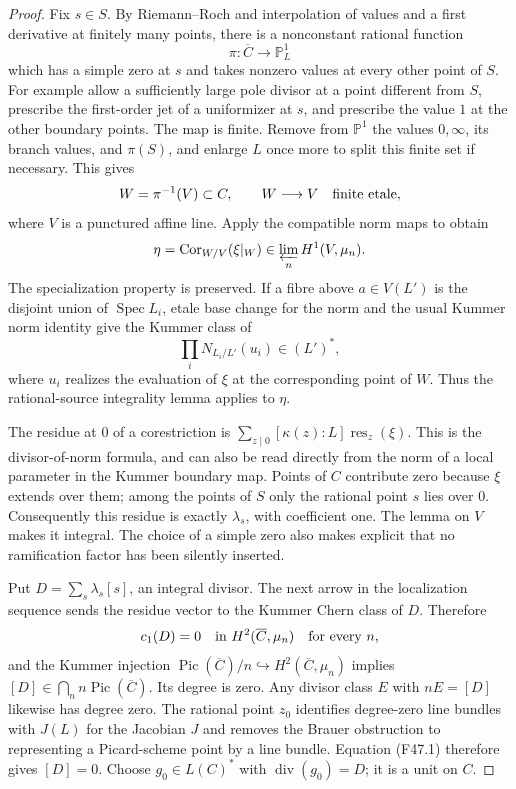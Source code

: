 \begin{proof}
Fix $s\in S$. By Riemann--Roch and interpolation of values and a
first derivative at finitely many points, there is a nonconstant
rational function
\[
 \pi:\overline C\longrightarrow\mathbb P^1_L
\]
which has a simple zero at $s$ and takes nonzero values at every
other point of $S$. For example allow a sufficiently large pole
divisor at a point different from $S$, prescribe the first-order
jet of a uniformizer at $s$, and prescribe the value $1$ at the
other boundary points. The map is finite. Remove from $\mathbb P^1$
the values $0,\infty$, its branch values, and $\pi(S)$, and enlarge
$L$ once more to split this finite set if necessary. This gives
\[
 W=\pi^{-1}(V)\subset C,\qquad W\longrightarrow V
 \quad\hbox{finite etale},
\]
where $V$ is a punctured affine line. Apply the compatible norm
maps to obtain
\[
 \eta=\operatorname{Cor}_{W/V}(\xi|_W)
        \in\varprojlim_n H^1(V,\mu_n).
\]
The specialization property is preserved. If a fibre above
$a\in V(L')$ is the disjoint union of $\operatorname{Spec}L_i$,
etale base change for the norm and the usual Kummer norm identity
give the Kummer class of
\[
        \prod_i N_{L_i/L'}(u_i)\in(L')^*,
\]
where $u_i$ realizes the evaluation of $\xi$ at the corresponding
point of $W$. Thus the rational-source integrality lemma applies to
$\eta$.

The residue at $0$ of a corestriction is
$\sum_{z\mid0}[\kappa(z):L]\operatorname{res}_z(\xi)$.
This is the divisor-of-norm formula, and can also be read directly
from the norm of a local parameter in the Kummer boundary map.
Points of $C$ contribute zero because $\xi$ extends over them;
among the points of $S$ only the rational point $s$ lies over $0$.
Consequently this residue is exactly $\lambda_s$, with coefficient
one. The lemma on $V$ makes it integral. The choice of a simple
zero also makes explicit that no ramification factor has been
silently inserted.

Put $D=\sum_s\lambda_s[s]$, an integral divisor. The next arrow in
the localization sequence sends the residue vector to the Kummer
Chern class of $D$. Therefore
\[
 c_1(D)=0\quad\hbox{in }H^2(\overline C,\mu_n)
       \quad\hbox{for every }n,
\]
and the Kummer injection
$\operatorname{Pic}(\overline C)/n\hookrightarrow
H^2(\overline C,\mu_n)$ implies
$[D]\in\bigcap_n n\operatorname{Pic}(\overline C)$.
Its degree is zero. Any divisor class $E$ with $nE=[D]$ likewise
has degree zero. The rational point $z_0$ identifies degree-zero
line bundles with $J(L)$ for the Jacobian $J$ and removes the
Brauer obstruction to representing a Picard-scheme point by a line
bundle. Equation (F47.1) therefore gives $[D]=0$.
Choose $g_0\in L(C)^*$ with $\operatorname{div}(g_0)=D$;
it is a unit on $C$.


\end{proof}
